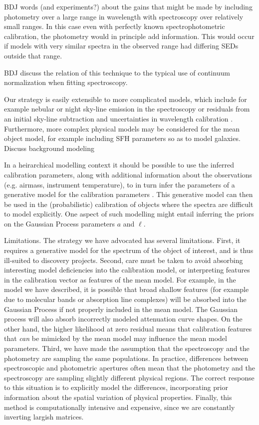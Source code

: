 \documentclass[iop,numberedappendix]{emulateapj}
\begin{document}
{\color{blue} BDJ words (and experiments?) about the gains that might
be made by including photometry over a large range in wavelength with
spectroscopy over relatively small ranges.}  In this case even with
perfectly known spectrophotometric calibration, the photometry would
in principle add information.  This would occur if models with very
similar spectra in the observed range had differing SEDs outside that
range.

{\color{blue} BDJ discuss the relation of this technique to the typical use of
continuum normalization when fitting spectroscopy.}

Our strategy is easily extensible to more complicated models, which
include for example nebular or night sky-line emission in the
spectroscopy \citep[e.g.,][]{gullikson14} or residuals from an initial
sky-line subtraction and uncertainties in wavelength calibration
\citep[e.g.,][]{walker15}. Furthermore, more complex physical models
may be considered for the mean object model, for example including SFH
parameters so as to model galaxies. {\color{blue} Discuss background
modeling}

In a heirarchical modelling context it should be possible to use the
inferred calibration parameters, along with additional information
about the observations (e.g. airmass, instrument temperature), to in
turn infer the parameters of a generative model for the calibration
parameters \citep[e.g.][]{spectrophot}. This generative model can then
be used in the (probabilistic) calibration of objects where the
spectra are difficult to model explicitly.  One aspect of such
modelling might entail inferring the priors on the Gaussian Process
parameters $a$ and $\ell$.

Limitations.  The strategy we have advocated has several limitations.
First, it requires a generative model for the spectrum of the object
of interest, and is thus ill-suited to discovery projects.  Second,
care must be taken to avoid absorbing interesting model deficiencies
into the calibration model, or interpreting features in the
calibration vector as features of the mean model. For example, in the
model we have described, it is possible that broad shallow features
(for example due to molecular bands or absorption line complexes) will
be absorbed into the Gaussian Process if not properly included in the
mean model. The Gaussian process will also absorb incorrectly modeled
attenuation curve shapes. On the other hand, the higher likelihood at
zero residual means that calibration features that \emph{can} be
mimicked by the mean model may influence the mean model
parameters. Third, we have made the assumption that the spectroscopy
and the photometry are sampling the same populations.  In practice,
differences between spectroscopic and photometric apertures often mean
that the photometry and the spectroscopy are sampling slightly
different physical regions.  The correct response to this situation is
to explicitly model the differences, incorporating prior information
about the spatial variation of physical properties.  Finally, this
method is computationally intensive and expensive, since we are
constantly inverting largish matrices.
\end{document}
